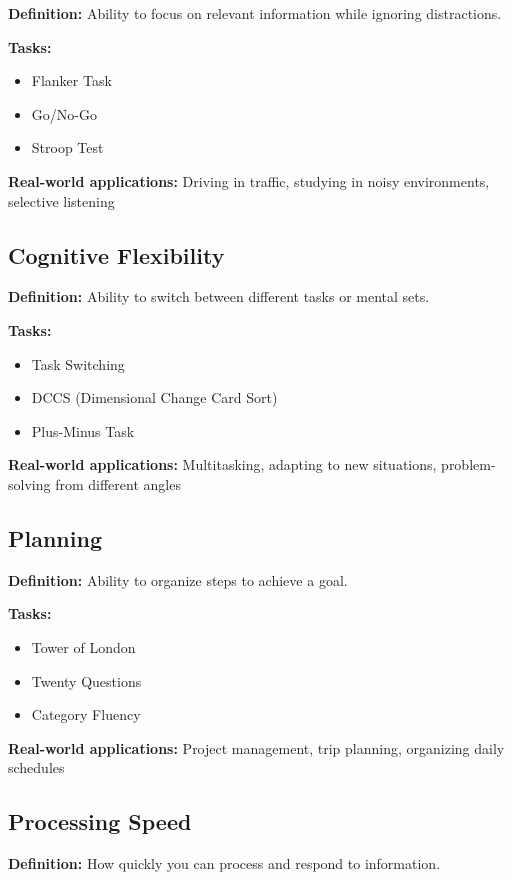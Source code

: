 \documentclass[12pt,a4paper]{article}
\begin{document}
\textbf{Definition:} Ability to focus on relevant information while ignoring distractions.

\textbf{Tasks:}
\begin{itemize}
    \item Flanker Task
    \item Go/No-Go
    \item Stroop Test
\end{itemize}

\textbf{Real-world applications:} Driving in traffic, studying in noisy environments, selective listening

\subsection{Cognitive Flexibility}

\textbf{Definition:} Ability to switch between different tasks or mental sets.

\textbf{Tasks:}
\begin{itemize}
    \item Task Switching
    \item DCCS (Dimensional Change Card Sort)
    \item Plus-Minus Task
\end{itemize}

\textbf{Real-world applications:} Multitasking, adapting to new situations, problem-solving from different angles

\subsection{Planning}

\textbf{Definition:} Ability to organize steps to achieve a goal.

\textbf{Tasks:}
\begin{itemize}
    \item Tower of London
    \item Twenty Questions
    \item Category Fluency
\end{itemize}

\textbf{Real-world applications:} Project management, trip planning, organizing daily schedules

\subsection{Processing Speed}

\textbf{Definition:} How quickly you can process and respond to information.
\end{document}
